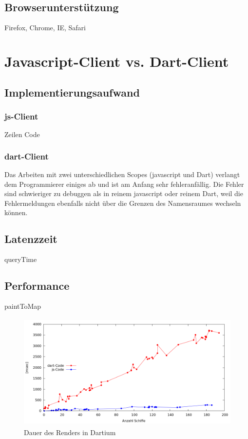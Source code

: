 \subsection{Browserunterstützung}
Firefox, Chrome, IE, Safari


\section{Javascript-Client vs. Dart-Client} 
\subsection{Implementierungsaufwand}

\subsubsection{js-Client}
Zeilen Code
\subsubsection{dart-Client}
Das Arbeiten mit zwei unterschiedlichen Scopes (javascript und Dart) verlangt dem Programmierer einiges ab und ist am Anfang sehr fehleranfällig. Die Fehler sind schwieriger zu debuggen als in reinem javascript oder reinem Dart, weil die Fehlermeldungen ebenfalls nicht über die Grenzen des Namensraumes wechseln können. 

\subsection{Latenzzeit}
queryTime

\subsection{Performance}
paintToMap
\newpage

\begin {figure}[H]
\begin{center}
  \includegraphics[height=2.3in]{images/Dartium.png}
\end{center}
 \caption{Dauer des Renders in Dartium}
\end {figure}


